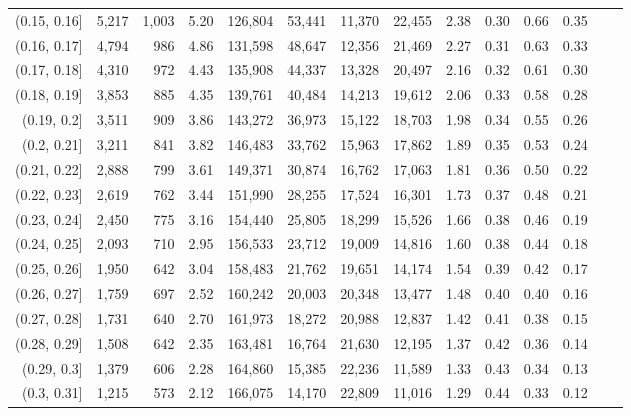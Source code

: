 \begin{tabular}{rrrrrrrrrrrrrr}
(0.15, 0.16]   &   5,217 &  1,003 &    5.20 &  126,804 &   53,441 &  11,370 &  22,455 &  2.38 &  0.30 &  0.66 &      0.35 \\
(0.16, 0.17]   &   4,794 &    986 &    4.86 &  131,598 &   48,647 &  12,356 &  21,469 &  2.27 &  0.31 &  0.63 &      0.33 \\
(0.17, 0.18]   &   4,310 &    972 &    4.43 &  135,908 &   44,337 &  13,328 &  20,497 &  2.16 &  0.32 &  0.61 &      0.30 \\
(0.18, 0.19]   &   3,853 &    885 &    4.35 &  139,761 &   40,484 &  14,213 &  19,612 &  2.06 &  0.33 &  0.58 &      0.28 \\
(0.19, 0.2]    &   3,511 &    909 &    3.86 &  143,272 &   36,973 &  15,122 &  18,703 &  1.98 &  0.34 &  0.55 &      0.26 \\
(0.2, 0.21]    &   3,211 &    841 &    3.82 &  146,483 &   33,762 &  15,963 &  17,862 &  1.89 &  0.35 &  0.53 &      0.24 \\
(0.21, 0.22]   &   2,888 &    799 &    3.61 &  149,371 &   30,874 &  16,762 &  17,063 &  1.81 &  0.36 &  0.50 &      0.22 \\
(0.22, 0.23]   &   2,619 &    762 &    3.44 &  151,990 &   28,255 &  17,524 &  16,301 &  1.73 &  0.37 &  0.48 &      0.21 \\
(0.23, 0.24]   &   2,450 &    775 &    3.16 &  154,440 &   25,805 &  18,299 &  15,526 &  1.66 &  0.38 &  0.46 &      0.19 \\
(0.24, 0.25]   &   2,093 &    710 &    2.95 &  156,533 &   23,712 &  19,009 &  14,816 &  1.60 &  0.38 &  0.44 &      0.18 \\
(0.25, 0.26]   &   1,950 &    642 &    3.04 &  158,483 &   21,762 &  19,651 &  14,174 &  1.54 &  0.39 &  0.42 &      0.17 \\
(0.26, 0.27]   &   1,759 &    697 &    2.52 &  160,242 &   20,003 &  20,348 &  13,477 &  1.48 &  0.40 &  0.40 &      0.16 \\
(0.27, 0.28]   &   1,731 &    640 &    2.70 &  161,973 &   18,272 &  20,988 &  12,837 &  1.42 &  0.41 &  0.38 &      0.15 \\
(0.28, 0.29]   &   1,508 &    642 &    2.35 &  163,481 &   16,764 &  21,630 &  12,195 &  1.37 &  0.42 &  0.36 &      0.14 \\
(0.29, 0.3]    &   1,379 &    606 &    2.28 &  164,860 &   15,385 &  22,236 &  11,589 &  1.33 &  0.43 &  0.34 &      0.13 \\
(0.3, 0.31]    &   1,215 &    573 &    2.12 &  166,075 &   14,170 &  22,809 &  11,016 &  1.29 &  0.44 &  0.33 &      0.12 \\

\end{tabular}
